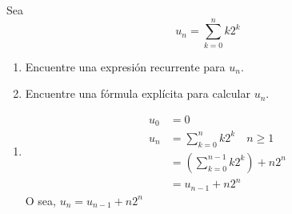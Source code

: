 \begin{ejercicio}
    Sea 
    \begin{equation*}
        u_n = \sum_{k = 0}^n k 2^k
    \end{equation*}

    \begin{enumerate}
        \item Encuentre una expresión recurrente para $u_n$.
        \item Encuentre una fórmula explícita para calcular $u_n$.
    \end{enumerate}

    \begin{enumerate} 
        \item 
        \begin{align*}
            u_0 &= 0 \\
            u_n &= \sum_{k=0}^n k 2^k \quad n \geq 1\\
                &= \left(\sum_{k=0}^{n-1} k2^k\right) + n2^n \\
                &= u_{n-1} + n2^n
        \end{align*}
        O sea, $u_n = u_{n-1} + n 2^n$


\end{enumerate}
\end{ejercicio}
